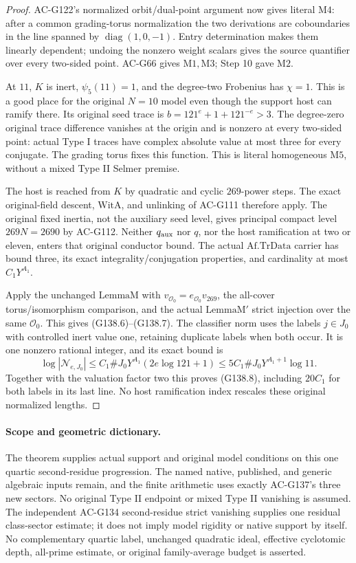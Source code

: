 \begin{proof}
AC-G122's normalized orbit/dual-point argument now gives
literal \(\mathrm{M4}\): after a common grading-torus
normalization the two derivations are coboundaries in
the line spanned by \(\operatorname{diag}(1,0,-1)\).
Entry determination makes them linearly dependent;
undoing the nonzero weight scalars gives the source
quantifier over every two-sided point.
AC-G66 gives \(\mathrm{M1},\mathrm{M3}\); Step 10 gave
\(\mathrm{M2}\).

At \(11\), \(K\) is inert, \(\psi_5(11)=1\), and the
degree-two Frobenius has \(\chi=1\).  This is a good
place for the original \(N=10\) model even though the
support host can ramify there.
Its original seed trace is
\(b=121^e+1+121^{-e}>3\).
The degree-zero original trace difference vanishes at
the origin and is nonzero at every two-sided point:
actual Type I traces have complex absolute value at
most three for every conjugate.  The grading torus
fixes this function.  This is literal homogeneous
\(\mathrm{M5}\), without a mixed Type II Selmer premise.

The host is reached from \(K\) by quadratic and cyclic
\(269\)-power steps.  The exact original-field descent,
\(\mathrm{WitA}\), and unlinking of AC-G111 therefore
apply.  The original fixed inertia, not the auxiliary
seed level, gives principal compact level
\(269N=2690\) by AC-G112.
Neither \(q_{\rm aux}\) nor \(q\), nor the host
ramification at two or eleven, enters that original
conductor bound.
The actual \(\mathrm{Af.TrData}\) carrier has bound
three, its exact integrality/conjugation properties,
and cardinality at most \(C_1Y^{A_1}\).

Apply the unchanged \(\mathrm{LemmaM}\) with
\(v_{\mathcal O_0}=e_{\mathcal O_0}v_{269}\), the
all-cover torus/isomorphism comparison, and the actual
\(\mathrm{LemmaM'}\) strict injection over the same
\(\mathcal O_0\).  This gives (G138.6)--(G138.7).
The classifier norm uses the labels \(j\in J_0\) with
controlled inert value one, retaining duplicate labels
when both occur.  It is one nonzero rational integer,
and its exact bound is
\[
 \log|\mathcal N_{e,J_0}|
 \le C_1\#J_0Y^{A_1}(2e\log121+1)
 \le5C_1\#J_0Y^{A_1+1}\log11.
 \tag{G138.32}
\]
Together with the valuation factor two this proves
(G138.8), including \(20C_1\) for both labels in its
last line.  No host ramification index rescales these
original normalized lengths.
\end{proof}

\paragraph{Scope and geometric dictionary.}
The theorem supplies actual support and original model
conditions on this one quartic second-residue progression.
The named native, published, and generic algebraic inputs
remain, and the finite arithmetic uses exactly AC-G137's
three new sectors.  No original Type II endpoint or mixed
Type II vanishing is assumed.
The independent AC-G134 second-residue strict vanishing supplies one
residual class-sector estimate; it does not imply model
rigidity or native support by itself.
No complementary quartic label, unchanged
quadratic ideal, effective cyclotomic depth, all-prime
estimate, or original family-average budget is asserted.

